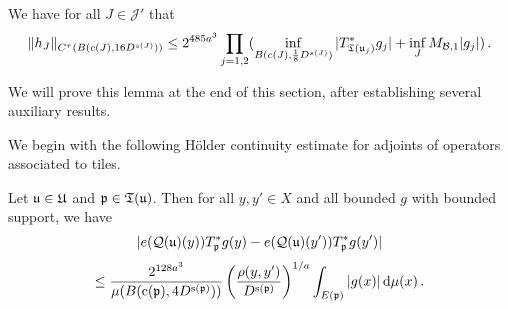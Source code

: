     \begin{lemma}
        \label{Holder-correlation-tree}
        \leanok
        We have for all $J \in \mathcal{J}'$ that
      \begin{equation}
            \label{hHolder}
            \|h_J\|_{C^{\tau}(B(c(J), 16D^{s(J)}))} \le 2^{485a^3} \prod_{j = 1,2} (\inf_{B(c(J), \frac{1}{8}D^{s(J)})} |T_{{\mathfrak T}({\mathfrak u}_j)}^* g_j| + \inf_J M_{\mathcal{B}, 1} |g_j|)\,.
        \end{equation}
    \end{lemma}

    We will prove this lemma at the end of this section, after establishing several auxiliary results.

    We begin with the following H\"older continuity estimate for adjoints of operators associated to tiles.
    \begin{lemma}
        \label{Holder-correlation-tile}
        \leanok
        Let ${\mathfrak u} \in {\mathfrak U}$ and ${\mathfrak p} \in {\mathfrak T}({\mathfrak u})$. Then for all $y, y' \in X$ and all bounded $g$ with bounded support, we have
        $$
            |e({\mathcal{Q}}({\mathfrak u})(y)) T_{{\mathfrak p}}^* g(y) - e({\mathcal{Q}}({\mathfrak u})(y')) T_{{\mathfrak p}}^* g(y')|
        $$
      \begin{equation}
            \label{T*Holder2}
            \le \frac{2^{128a^3}}{\mu(B({\mathrm{c}}({\mathfrak p}), 4D^{{\mathrm{s}}({\mathfrak p})}))} \left(\frac{\rho(y, y')}{D^{{\mathrm{s}}({\mathfrak p})}}\right)^{1/a} \int_{E({\mathfrak p})} |g(x)| \, \mathrm{d}\mu(x)\,.
        \end{equation}
    \end{lemma}

